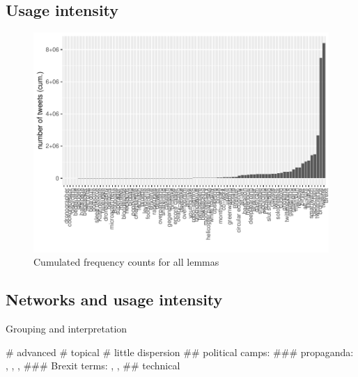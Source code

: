 \documentclass[
  a4paper,
  ]{scrartcl}
\begin{document}
  \subsection{Usage intensity}

    \begin{figure}[H]
      \centering
      \includegraphics[width=\linewidth, height=.8\textheight, keepaspectratio]{images/comp_ui_all_cum.pdf}
      \caption{Cumulated frequency counts for all lemmas}
    \end{figure}

  \subsection{Networks and usage intensity}

    Grouping and interpretation

      \begin{easylist}[itemize]
        # advanced
        # topical
        # little dispersion
          ## political camps:
            ### propaganda: , , , 
            ### Brexit terms: , , 
          ## technical
      \end{easylist}
\end{document}
